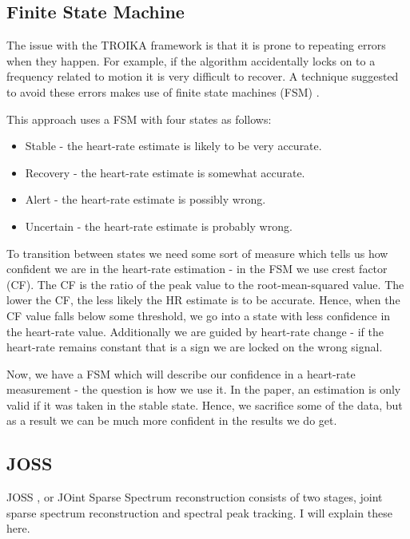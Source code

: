 \documentclass[12pt,a4paper,twoside,openright]{report}
\begin{document}
\subsection{Finite State Machine}

The issue with the TROIKA framework is that it is prone to repeating errors
when they happen. For example, if the algorithm accidentally locks on to a frequency
related to motion it is very difficult to recover. A technique
suggested to avoid these errors makes use of finite state machines (FSM)
\cite{Chung19}.

This approach uses a FSM with four states as follows: 

\begin{itemize}
	\item Stable - the heart-rate estimate is likely to be very accurate.
	\item Recovery - the heart-rate estimate is somewhat accurate.
	\item Alert - the heart-rate estimate is possibly wrong.
	\item Uncertain - the heart-rate estimate is probably wrong.
\end{itemize}

To transition between states we need some sort of measure which tells us how
confident we are in the heart-rate estimation - in the FSM we use crest factor
(CF). The CF is the ratio of the peak value to the root-mean-squared value.
The lower the CF, the less likely the HR estimate is to be accurate. Hence,
when the CF value falls below some threshold, we go into a state with less
confidence in the heart-rate value. Additionally we are guided by heart-rate
change - if the heart-rate remains constant that is a sign we are locked on
the wrong signal.

Now, we have a FSM which will describe our confidence in a heart-rate
measurement - the question is how we use it. In the paper, an estimation is
only valid if it was taken in the
stable state. Hence, we sacrifice some of the data, but as a result we can be
much more confident in the results we do get.

\subsection{JOSS} \label{joss-intro}

JOSS \cite{Zhang15.2}, or JOint Sparse Spectrum reconstruction consists of two
stages, joint sparse spectrum reconstruction and spectral peak tracking. I
will explain these here.
\end{document}
